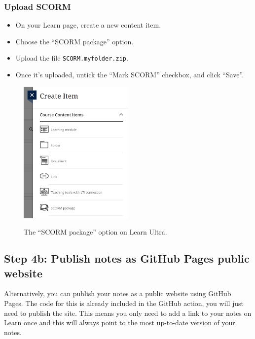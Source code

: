 \subsubsection{Upload SCORM}
\label{ssec:scorm}

\begin{itemize}
    \item On your Learn page, create a new content item.
    \item Choose the ``SCORM package'' option.
    \item Upload the file \verb|SCORM.myfolder.zip|.
    \item Once it's uploaded, untick the ``Mark SCORM'' checkbox, and click ``Save''.
\end{itemize}

\begin{figure}[h!]
    \centering
    \includegraphics[width=0.5\textwidth, alt={A screenshot of the ``Create content'' menu on Learn Ultra showing different options. The last option is ``SCORM package''.}]{img/scorm.png}
    \caption{The ``SCORM package'' option on Learn Ultra.}
    \label{fig:scorm}
\end{figure}


\subsection{Step 4b: Publish notes as GitHub Pages public website}

Alternatively, you can publish your notes as a public website using GitHub Pages. The code for this is already included in the GitHub action, you will just need to publish the site. This means you only need to add a link to your notes on Learn once and this will always point to the most up-to-date version of your notes.

